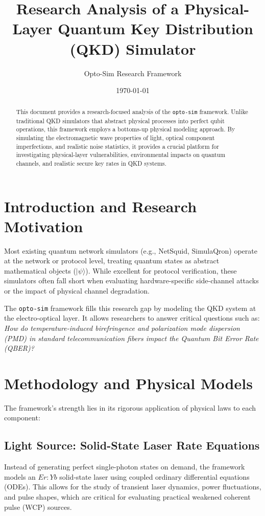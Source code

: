 \documentclass[12pt,a4paper]{article}
\title{Research Analysis of a Physical-Layer Quantum Key Distribution (QKD) Simulator}
\author{Opto-Sim Research Framework}
\date{\today}
\begin{document}
\maketitle

\begin{abstract}
This document provides a research-focused analysis of the \texttt{opto-sim} framework. Unlike traditional QKD simulators that abstract physical processes into perfect qubit operations, this framework employs a bottoms-up physical modeling approach. By simulating the electromagnetic wave properties of light, optical component imperfections, and realistic noise statistics, it provides a crucial platform for investigating physical-layer vulnerabilities, environmental impacts on quantum channels, and realistic secure key rates in QKD systems.
\end{abstract}

\section{Introduction and Research Motivation}
Most existing quantum network simulators (e.g., NetSquid, SimulaQron) operate at the network or protocol level, treating quantum states as abstract mathematical objects ($|\psi\rangle$). While excellent for protocol verification, these simulators often fall short when evaluating hardware-specific side-channel attacks or the impact of physical channel degradation.

The \texttt{opto-sim} framework fills this research gap by modeling the QKD system at the electro-optical layer. It allows researchers to answer critical questions such as: \textit{How do temperature-induced birefringence and polarization mode dispersion (PMD) in standard telecommunication fibers impact the Quantum Bit Error Rate (QBER)?}

\section{Methodology and Physical Models}
The framework's strength lies in its rigorous application of physical laws to each component:

\subsection{Light Source: Solid-State Laser Rate Equations}
Instead of generating perfect single-photon states on demand, the framework models an $Er:Yb$ solid-state laser using coupled ordinary differential equations (ODEs). This allows for the study of transient laser dynamics, power fluctuations, and pulse shapes, which are critical for evaluating practical weakened coherent pulse (WCP) sources.
\end{document}

